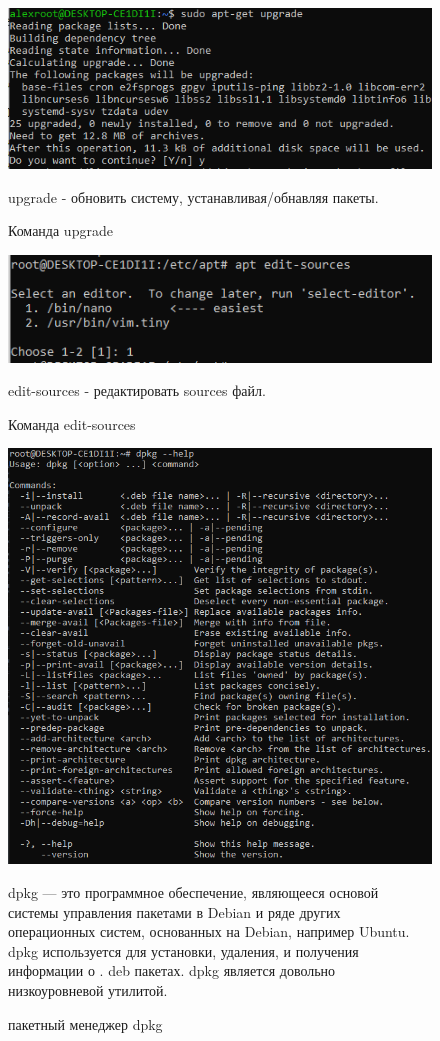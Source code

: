 \documentclass[a4paper,14pt]{extarticle}
\begin{document}
\begin{figure}[h!]
\centering
\includegraphics[width=1\linewidth]{upgrade.png}
\caption{Команда upgrade}
\label{fig:mpr}
upgrade - обновить систему, устанавливая/обнавляя пакеты. 
\end{figure}


\begin{figure}[h!]
\centering
\includegraphics[width=1\linewidth]{edit-sources.png}
\caption{Команда edit-sources}
\label{fig:mpr}
edit-sources - редактировать sources файл. 
\end{figure}

\begin{figure}[h!]
\centering
\includegraphics[width=1\linewidth]{dpkg.png}
\caption{пакетный менеджер dpkg}
\label{fig:mpr}
\centering
dpkg — это программное обеспечение, являющееся основой системы управления пакетами в Debian и ряде других операционных систем, основанных на Debian, например Ubuntu. dpkg используется для установки, удаления, и получения информации о . deb пакетах. dpkg является довольно низкоуровневой утилитой. 
\end{figure}
\end{document}
